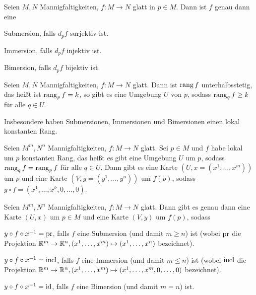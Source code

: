 \begin{proposition}
  Seien $M,N$ Mannigfaltigkeiten, $f\colon M \to N$ glatt in $p\in
  M$. Dann ist $f$ genau dann eine
  \begin{statements}
  \item Submersion, falls $d_pf$ surjektiv ist.
  \item Immersion, falls $d_pf$ injektiv ist.
  \item Bimersion, falls $d_pf$ bijektiv ist.
  \end{statements}
\end{proposition}

\begin{proposition}
  Seien $M,N$ Mannigfaltigkeiten, $f\colon M \to N$ glatt. Dann ist
  $\operatorname{rang} f$ unterhalbsstetig, das heißt ist $\operatorname{rang}_p f = k$, so gibt es
  eine Umgebung $U$ von $p$, sodass $\operatorname{rang}_q f \geq k$ für alle $q\in
  U$.

  Insbesondere haben Submersionen, Immersionen und Bimersionen einen
  lokal konstanten Rang.
\end{proposition}

\begin{satz}
  Seien $M^m,N^n$ Mannigfaltigkeiten, $f\colon M \to N$ glatt. Sei $p\in
  M$ und $f$ habe lokal um $p$ konstanten Rang, das heißt es gibt eine
  Umgebung $U$ um $p$, sodass $\operatorname{rang}_qf = \operatorname{rang}_pf$ für alle $q\in
  U$. Dann gibt es eine Karte $(U,x=(x^1,\dots,x^m))$ um $p$ und eine
  Karte $(V,y=(y^1,\dots,y^n))$ um $f(p)$, sodass $y\circ f = (x^1,\dots,x^k,0,\dots,0)$.
\end{satz}

\begin{korollar}[Normalformensatz]
  Seien $M^m,N^n$ Mannigfaltigkeiten, $f\colon M \to N$ glatt. Dann gibt
  es genau dann eine Karte $(U,x)$ um $p\in M$ und eine Karte $(V,y)$ um $f(p)$, sodass
  \begin{statements}
  \item $y\circ f\circ x^{-1} = \operatorname{pr}$, falls $f$ eine Submersion (und
    damit $m\geq n$) ist
    (wobei $\operatorname{pr}$ die Projektion $\mathbb{R}^m\to\mathbb{R}^n, (x^1,\dots,x^m) \mapsto
    (x^1,\dots,x^n)$ bezeichnet).
  \item $y\circ f\circ x^{-1} = \operatorname{incl}$, falls $f$ eine Immersion (und
    damit $m\leq n$) ist
    (wobei $\operatorname{incl}$ die Projektion $\mathbb{R}^m\to\mathbb{R}^n, (x^1,\dots,x^m) \mapsto
    (x^1,\dots,x^m,0,\dots,0)$ bezeichnet).
  \item $y\circ f\circ x^{-1} = \operatorname{id}$, falls $f$ eine Bimersion (und
    damit $m = n$) ist.
  \end{statements}
\end{korollar}

